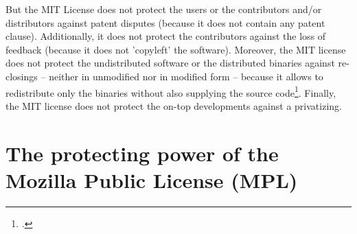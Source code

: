 But the MIT License does not protect the users or the contributors and/or
distributors against patent disputes (because it does not contain any patent
clause). Additionally, it does not protect the contributors against the loss of
feedback (because it does not 'copyleft' the software). Moreover, the MIT
license does not protect the undistributed software or the distributed binaries
against re-closings -- neither in unmodified nor in modified form -- because it
allows to redistribute only the binaries without also supplying the source
code\footcite[cf.][\nopage wp]{MitLicense2012a}. Finally, the MIT license does
not protect the on-top developments against a privatizing.

\section{The protecting power of the Mozilla Public License (MPL)}
 \label{sec:ProtectingPowerOfMpl}
 
